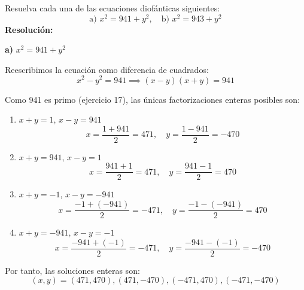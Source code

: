\documentclass[a4paper,12pt]{article}
\begin{document}
\begin{ejercicio}[title=Ejercicio 18]
Resuelva cada una de las ecuaciones diofánticas siguientes:
\[
\text{a) } x^2 = 941 + y^2, \quad 
\text{b) } x^2 = 943 + y^2
\]
\tcblower
\textbf{Resolución:}

\textbf{a) } $x^2 = 941 + y^2$

Reescribimos la ecuación como diferencia de cuadrados:
\[
x^2 - y^2 = 941 \implies (x - y)(x + y) = 941
\]

Como 941 es primo (ejercicio 17), las únicas factorizaciones enteras posibles son:

\begin{enumerate}
    \item $x+y = 1$, $x-y = 941$  
    \[
    x = \frac{1+941}{2} = 471, \quad y = \frac{1-941}{2} = -470
    \]

    \item $x+y = 941$, $x-y = 1$  
    \[
    x = \frac{941+1}{2} = 471, \quad y = \frac{941-1}{2} = 470
    \]

    \item $x+y = -1$, $x-y = -941$  
    \[
    x = \frac{-1+(-941)}{2} = -471, \quad y = \frac{-1-(-941)}{2} = 470
    \]

    \item $x+y = -941$, $x-y = -1$  
    \[
    x = \frac{-941+(-1)}{2} = -471, \quad y = \frac{-941-(-1)}{2} = -470
    \]
\end{enumerate}

Por tanto, las soluciones enteras son:
\[
\boxed{(x,y) = (471,470), (471,-470), (-471,470), (-471,-470)}
\]

\end{ejercicio}
\end{document}
